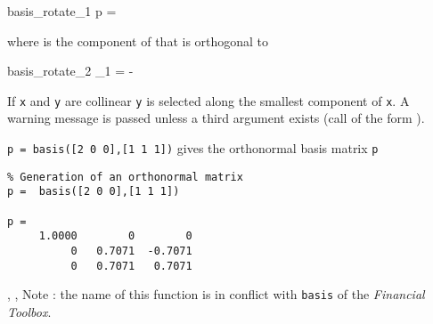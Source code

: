 \begin{eqsvg}{basis_rotate_1}
   p = 
\end{eqsvg}

\noindent where  is the component of  that is orthogonal to 

\begin{eqsvg}{basis_rotate_2}
  _1 = -
\end{eqsvg}


\noindent If {\tt x} and {\tt y} are collinear {\tt y} is selected along the smallest component of {\tt x}.  A warning message is passed unless a third argument exists (call of the form ).

{\tt  p =  basis([2 0 0],[1 1 1])} gives the orthonormal basis matrix {\tt p}

\begin{verbatim}
% Generation of an orthonormal matrix
p =  basis([2 0 0],[1 1 1])

p = 
     1.0000        0        0
          0   0.7071  -0.7071
          0   0.7071   0.7071
\end{verbatim}



\noindent \beam, , \newline
Note : the name of this function is in conflict with {\tt basis} of the {\sl Financial Toolbox}.



